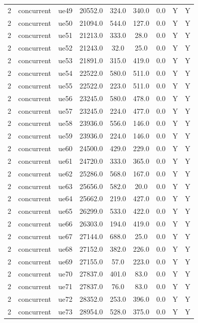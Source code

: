 \begin{table}[ht]
\begin{tabular}{|c|c|c|c|c|c|c|c|c|}
2 & concurrent & ue49 & 20552.0 & 324.0 & 340.0 & 0.0 & Y & Y \\
2 & concurrent & ue50 & 21094.0 & 544.0 & 127.0 & 0.0 & Y & Y \\
2 & concurrent & ue51 & 21213.0 & 333.0 & 28.0 & 0.0 & Y & Y \\
2 & concurrent & ue52 & 21243.0 & 32.0 & 25.0 & 0.0 & Y & Y \\
2 & concurrent & ue53 & 21891.0 & 315.0 & 419.0 & 0.0 & Y & Y \\
2 & concurrent & ue54 & 22522.0 & 580.0 & 511.0 & 0.0 & Y & Y \\
2 & concurrent & ue55 & 22522.0 & 223.0 & 511.0 & 0.0 & Y & Y \\
2 & concurrent & ue56 & 23245.0 & 580.0 & 478.0 & 0.0 & Y & Y \\
2 & concurrent & ue57 & 23245.0 & 224.0 & 477.0 & 0.0 & Y & Y \\
2 & concurrent & ue58 & 23936.0 & 556.0 & 146.0 & 0.0 & Y & Y \\
2 & concurrent & ue59 & 23936.0 & 224.0 & 146.0 & 0.0 & Y & Y \\
2 & concurrent & ue60 & 24500.0 & 429.0 & 229.0 & 0.0 & Y & Y \\
2 & concurrent & ue61 & 24720.0 & 333.0 & 365.0 & 0.0 & Y & Y \\
2 & concurrent & ue62 & 25286.0 & 568.0 & 167.0 & 0.0 & Y & Y \\
2 & concurrent & ue63 & 25656.0 & 582.0 & 20.0 & 0.0 & Y & Y \\
2 & concurrent & ue64 & 25662.0 & 219.0 & 427.0 & 0.0 & Y & Y \\
2 & concurrent & ue65 & 26299.0 & 533.0 & 422.0 & 0.0 & Y & Y \\
2 & concurrent & ue66 & 26303.0 & 194.0 & 419.0 & 0.0 & Y & Y \\
2 & concurrent & ue67 & 27144.0 & 688.0 & 25.0 & 0.0 & Y & Y \\
2 & concurrent & ue68 & 27152.0 & 382.0 & 226.0 & 0.0 & Y & Y \\
2 & concurrent & ue69 & 27155.0 & 57.0 & 223.0 & 0.0 & Y & Y \\
2 & concurrent & ue70 & 27837.0 & 401.0 & 83.0 & 0.0 & Y & Y \\
2 & concurrent & ue71 & 27837.0 & 76.0 & 83.0 & 0.0 & Y & Y \\
2 & concurrent & ue72 & 28352.0 & 253.0 & 396.0 & 0.0 & Y & Y \\
2 & concurrent & ue73 & 28954.0 & 528.0 & 375.0 & 0.0 & Y & Y \\

\end{tabular}
\end{table}
